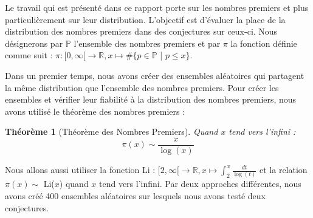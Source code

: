 \documentclass[../main.tex]{subfile}
\begin{document}
\theoremstyle{plain}
\newtheorem{Thm}{Théorème}

Le travail qui est présenté dans ce rapport porte sur les nombres premiers et plus particulièrement sur leur distribution. L'objectif est d'évaluer la place de la distribution des nombres premiers dans des conjectures sur ceux-ci. Nous désignerons par $\mathbb{P}$ l'ensemble des nombres premiers et par $\pi$ la fonction définie comme suit : $\pi : [0, \infty [ \rightarrow \mathbb{R}, x \mapsto \# \{p \in \mathbb{P}$ | $p \leqslant x\}$. 

Dans un premier temps, nous avons créer des ensembles aléatoires qui partagent la même distribution que l'ensemble des nombres premiers. Pour créer les ensembles et vérifier leur fiabilité à la distribution des nombres premiers, nous avons utilisé le théorème des nombres premiers : 
\begin{Thm}[Théorème des Nombres Premiers]
\label{TNP}
	Quand $x$ tend vers l'infini : 
	\[ \pi(x) \sim \frac{x}{\log(x)}  \] 
\end{Thm}
Nous allons aussi utiliser la fonction Li : $ [2, \infty [ \rightarrow \mathbb{R}, x \mapsto \int_{2}^{x} \frac{dt}{\log(t)} $ et la relation $\pi(x) \sim$ Li($x$) quand $x$ tend vers l'infini.  Par deux approches différentes, nous avons créé 400 ensembles aléatoires sur lesquels nous avons testé deux conjectures. 
 
\clearpage
\end{document}
